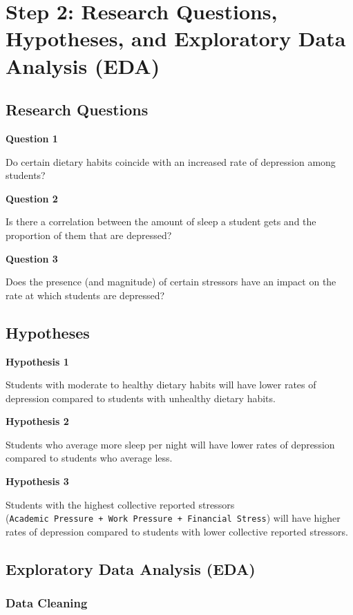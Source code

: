 \documentclass[
  letterpaper,
  DIV=11,
  numbers=noendperiod]{scrartcl}
\begin{document}
\section{Step 2: Research Questions, Hypotheses, and Exploratory Data
Analysis
(EDA)}\label{step-2-research-questions-hypotheses-and-exploratory-data-analysis-eda}

\subsection{Research Questions}\label{research-questions}

\textbf{Question 1}

Do certain dietary habits coincide with an increased rate of depression
among students?

\textbf{Question 2}

Is there a correlation between the amount of sleep a student gets and
the proportion of them that are depressed?

\textbf{Question 3}

Does the presence (and magnitude) of certain stressors have an impact on
the rate at which students are depressed?

\subsection{Hypotheses}\label{hypotheses}

\textbf{Hypothesis 1}

Students with moderate to healthy dietary habits will have lower rates
of depression compared to students with unhealthy dietary habits.

\textbf{Hypothesis 2}

Students who average more sleep per night will have lower rates of
depression compared to students who average less.

\textbf{Hypothesis 3}

Students with the highest collective reported stressors
(\texttt{Academic\ Pressure\ +\ Work\ Pressure\ +\ Financial\ Stress})
will have higher rates of depression compared to students with lower
collective reported stressors.

\subsection{Exploratory Data Analysis
(EDA)}\label{exploratory-data-analysis-eda}

\subsubsection{Data Cleaning}\label{data-cleaning}
\end{document}
